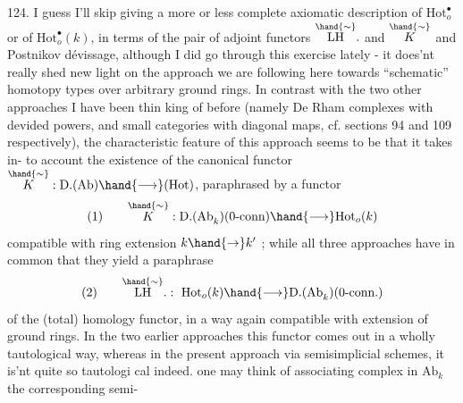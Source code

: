 
124.   I guess I'll skip giving a more  or less complete axiomatic
description of $\mathrm{Hot}^{\bullet}_{o}$ or of $\mathrm{Hot}^{\bullet}_{o}(k)$,  in terms of the pair of adjoint
functors $\overset{\hand{\sim}}{\mathrm{LH}}.$ and $\overset{\hand{\sim}}{K}$ and Postnikov dévissage,  although I did go through
this exercise lately - it does'nt really shed new light on the approach
we are following here towards ``schematic'' homotopy types over arbitrary
ground rings.  In contrast with the two other approaches I have been thin%
\hand{-}king of before (namely De Rham complexes with devided powers,  and small
categories with diagonal maps,  cf. sections 94 and 109 respectively),
the characteristic feature of this approach seems to be that it takes in-%
to account the existence of the canonical functor  
  $\overset{\hand{\sim}}{K} : \mathrm{D.(Ab)} \hand{\longrightarrow} (\mathrm{Hot})$,  paraphrased by a functor
\[ (1) \qquad \overset{\hand{\sim}}{K} : \mathrm{D.(Ab}_k)(\text{0-conn}) \hand{\longrightarrow} \mathrm{Hot}_o(k) \]
compatible with ring extension $k \hand{\to} k'$ ;  while all three approaches have
in common  that they yield a paraphrase
\[ (2) \qquad \overset{\hand{\sim}}{\mathrm{LH}}. :\ \mathrm{Hot}_o(k) \hand{\longrightarrow} \mathrm{D.(Ab}_k)(\text{0-conn.}) \]
of the  (total) homology functor,  in a way again compatible with
extension of ground rings.  In the two earlier approaches this  functor
comes out in a wholly tautological way,  whereas in the
present approach via semisimplicial schemes,  it is'nt quite so tautologi%
cal indeed.   
 
  one may think
of associating  complex in $\mathrm{Ab}_k$  the corresponding semi-%
